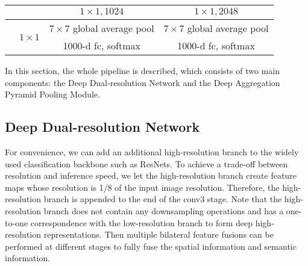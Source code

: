 \documentclass[journal]{IEEEtran}
\begin{document}
\begin{table*}[]
\begin{tabular}{p{40pt}<{\centering}|p{60pt}<{\centering}|p{85pt}<{\centering}|p{85pt}<{\centering}|p{85pt}<{\centering}|p{85pt}<{\centering}}
                       & & \multicolumn{2}{c|}{$1\times1, 1024$} & \multicolumn{2}{c}{$1\times1, 2048$}                 \\ \hline
                       &\multirow{2}{*}{$1\times1$} & \multicolumn{2}{c|}{$7\times7$ global average pool} & \multicolumn{2}{c}{$7\times7$ global average pool}                                      \\ \cline{3-6}
                       & & \multicolumn{2}{c|}{1000-d fc, softmax} & \multicolumn{2}{c}{1000-d fc, softmax}                 \\ \bottomrule
\end{tabular}
\end{table*}

In this section, the whole pipeline is described, which consists of two main components: the Deep Dual-resolution Network and the Deep Aggregation Pyramid Pooling Module.

\subsection{Deep Dual-resolution Network}

For convenience, we can add an additional high-resolution branch to the widely used classification backbone such as ResNets. To achieve a trade-off between resolution and inference speed, we let the high-resolution branch create feature maps whose resolution is 1/8 of the input image resolution. Therefore, the high-resolution branch is appended to the end of the conv3 stage. Note that the high-resolution branch does not contain any downsampling operations and has a one-to-one correspondence with the low-resolution branch to form deep high-resolution representations. Then multiple bilateral feature fusions can be performed at different stages to fully fuse the spatial information and semantic information.
\end{document}
